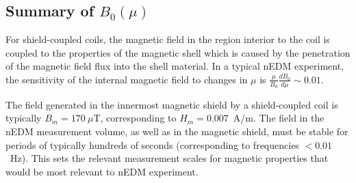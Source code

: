 \subsection{Summary of $B_0(\mu)$ \label{sec:theory_summary}}

For shield-coupled coils, the magnetic field in the region interior to
the coil is coupled to the properties of the magnetic shell which is
caused by the penetration of the magnetic field flux into the shell
material. In a typical nEDM experiment, the sensitivity of the
internal magnetic field to changes in $\mu$ is
$\frac{\mu}{B_0}\frac{dB_0}{d\mu}\sim 0.01$.

The field generated in the innermost magnetic shield by a
shield-coupled coil is typically $B_m=170~\mu$T, corresponding to
$H_m=0.007$~A/m.  The field in the nEDM measurement volume, as well as
in the magnetic shield, must be stable for periods of typically
hundreds of seconds (corresponding to frequencies $<0.01$~Hz).  This
sets the relevant measurement scales for magnetic properties that
would be most relevant to nEDM experiment.
